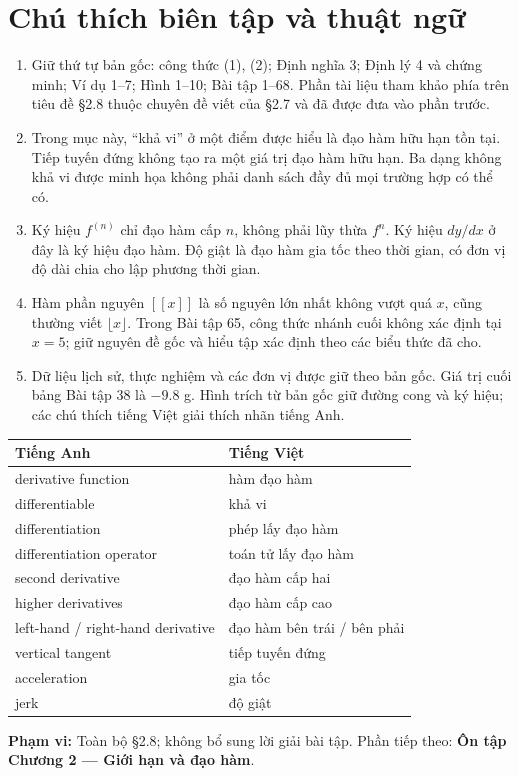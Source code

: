 \documentclass[12pt,a4paper]{article}
\newcommand{\gint}[1]{\left[\!\left[#1\right]\!\right]}
\begin{document}
\section*{Chú thích biên tập và thuật ngữ}
\begin{enumerate}
\item Giữ thứ tự bản gốc: công thức (1), (2); Định nghĩa 3; Định lý 4 và chứng minh; Ví dụ 1–7; Hình 1–10; Bài tập 1–68. Phần tài liệu tham khảo phía trên tiêu đề §2.8 thuộc chuyên đề viết của §2.7 và đã được đưa vào phần trước.
\item Trong mục này, “khả vi” ở một điểm được hiểu là đạo hàm hữu hạn tồn tại. Tiếp tuyến đứng không tạo ra một giá trị đạo hàm hữu hạn. Ba dạng không khả vi được minh họa không phải danh sách đầy đủ mọi trường hợp có thể có.
\item Ký hiệu $f^{(n)}$ chỉ đạo hàm cấp $n$, không phải lũy thừa $f^n$. Ký hiệu $dy/dx$ ở đây là ký hiệu đạo hàm. Độ giật là đạo hàm gia tốc theo thời gian, có đơn vị độ dài chia cho lập phương thời gian.
\item Hàm phần nguyên $\gint{x}$ là số nguyên lớn nhất không vượt quá $x$, cũng thường viết $\lfloor x\rfloor$. Trong Bài tập 65, công thức nhánh cuối không xác định tại $x=5$; giữ nguyên đề gốc và hiểu tập xác định theo các biểu thức đã cho.
\item Dữ liệu lịch sử, thực nghiệm và các đơn vị được giữ theo bản gốc. Giá trị cuối bảng Bài tập 38 là $-9.8$ g. Hình trích từ bản gốc giữ đường cong và ký hiệu; các chú thích tiếng Việt giải thích nhãn tiếng Anh.
\end{enumerate}
\begin{center}\begin{tabular}{ll}\toprule Tiếng Anh&Tiếng Việt\\\midrule
derivative function&hàm đạo hàm\\
differentiable&khả vi\\
differentiation&phép lấy đạo hàm\\
differentiation operator&toán tử lấy đạo hàm\\
second derivative&đạo hàm cấp hai\\
higher derivatives&đạo hàm cấp cao\\
left-hand / right-hand derivative&đạo hàm bên trái / bên phải\\
vertical tangent&tiếp tuyến đứng\\
acceleration&gia tốc\\
jerk&độ giật\\\bottomrule
\end{tabular}\end{center}
\noindent\textbf{Phạm vi:} Toàn bộ §2.8; không bổ sung lời giải bài tập. Phần tiếp theo: \textbf{Ôn tập Chương 2 — Giới hạn và đạo hàm}.
\end{document}
